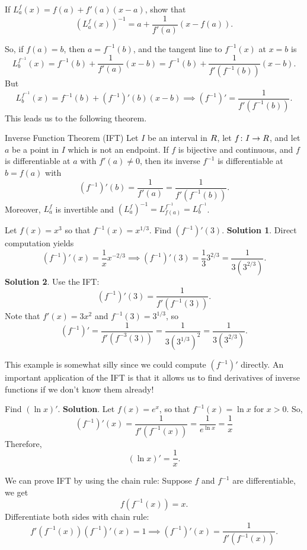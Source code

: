 \begin{Exercise}{}{}
    If $ L_a^f(x)=f(a)+f'(a)(x-a) $, show that
    \[ (L_a^f(x))^{-1}=a+\frac{1}{f'(a)}(x-f(a)). \]
\end{Exercise}
So, if $ f(a)=b $, then $ a=f^{-1}(b) $, and the tangent line to $ f^{-1}(x) $ at $ x=b $ is
\[ L_b^{f^{-1}}(x)=f^{-1}(b)+\frac{1}{f'(a)}(x-b)=f^{-1}(b)+\frac{1}{f'(f^{-1}(b))}(x-b). \]
But
\[ L_b^{f^{-1}}(x)=f^{-1}(b)+(f^{-1})'(b)(x-b)\implies (f^{-1})'=\frac{1}{f'(f^{-1}(b))}. \]
This leads us to the following theorem.

\begin{Theorem}{Inverse Function Theorem (IFT)}{}
    Let $ I $ be an interval in $ \relax{R} $, let $ f\colon I\to \relax{R} $, and let $ a $ be a point in $ I $ which is not an endpoint.
    If $ f $ is bijective and continuous, and $ f $ is differentiable at $ a $ with $ f'(a)\ne 0 $, then its inverse $ f^{-1} $
    is differentiable at $ b=f(a) $ with
    \[ (f^{-1})'(b)=\frac{1}{f'(a)}=\frac{1}{f'(f^{-1}(b))}. \]
    Moreover, $ L_a^f $ is invertible and $ (L_a^f)^{-1}=L_{f(a)}^{f^{-1}}=L_b^{f^{-1}} $.
\end{Theorem}
\begin{Example}{}{}
    Let $ f(x)=x^3 $ so that $ f^{-1}(x)=x^{1/3} $. Find $ (f^{-1})'(3) $.
    \tcblower{}
    \textbf{Solution 1}. Direct computation yields
    \[ (f^{-1})'(x)=\frac{1}{x}x^{-2/3}\implies (f^{-1})'(3)=\frac{1}{3}3^{2/3}=\frac{1}{3(3^{2/3})}. \]
    \textbf{Solution 2}. Use the IFT\@:
    \[ (f^{-1})'(3)=\frac{1}{f'(f^{-1}(3))}. \]
    Note that $ f'(x)=3x^2 $ and $ f^{-1}(3)=3^{1/3} $, so
    \[ (f^{-1})'=\frac{1}{f'(f^{-3}(3))}=\frac{1}{3(3^{1/3})^2}=\frac{1}{3(3^{2/3})}. \]
\end{Example}
This example is somewhat silly since we could compute $ (f^{-1})' $ directly. An important application of the IFT
is that it allows us to find derivatives of inverse functions if we don't know them already!
\begin{Example}{}{}
    Find $ (\ln x)' $.
    \tcblower{}
    \textbf{Solution}. Let $ f(x)=e^x $, so that $ f^{-1}(x)=\ln x $ for $ x>0 $. So,
    \[ (f^{-1})'(x)=\frac{1}{f'(f^{-1}(x))}=\frac{1}{e^{\ln x}}=\frac{1}{x} \]
    Therefore,
    \[ (\ln x)'=\frac{1}{x}. \]
\end{Example}
\begin{Remark}{}{}
    We can prove IFT by using the chain rule: Suppose $ f $ and $ f^{-1} $ are differentiable, we get
    \[ f(f^{-1}(x))=x. \]
    Differentiate both sides with chain rule:
    \[ f'(f^{-1}(x))(f^{-1})'(x)=1\implies (f^{-1})'(x)=\frac{1}{f'(f^{-1}(x))}. \]
\end{Remark}

